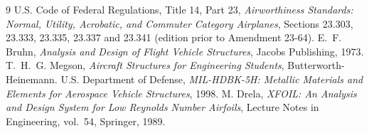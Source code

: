 \documentclass[11pt]{article}
\begin{document}
\begin{thebibliography}{9}
 U.S. Code of Federal Regulations, Title 14, Part 23, \emph{Airworthiness Standards: Normal, Utility, Acrobatic, and Commuter Category Airplanes}, Sections 23.303, 23.333, 23.335, 23.337 and 23.341 (edition prior to Amendment 23-64).
 E.~F. Bruhn, \emph{Analysis and Design of Flight Vehicle Structures}, Jacobs Publishing, 1973.
 T.~H.~G. Megson, \emph{Aircraft Structures for Engineering Students}, Butterworth-Heinemann.
 U.S. Department of Defense, \emph{MIL-HDBK-5H: Metallic Materials and Elements for Aerospace Vehicle Structures}, 1998.
 M. Drela, \emph{XFOIL: An Analysis and Design System for Low Reynolds Number Airfoils}, Lecture Notes in Engineering, vol.~54, Springer, 1989.
\end{thebibliography}
\end{document}
